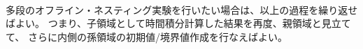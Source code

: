\\

\noindent 
多段のオフライン・ネスティング実験を行いたい場合は、以上の過程を繰り返せばよい。
つまり、子領域として時間積分計算した結果を再度、親領域と見立てて、
さらに内側の孫領域の初期値/境界値作成を行なえばよい。

